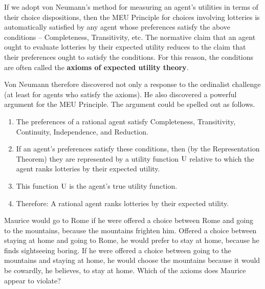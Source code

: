 
If we adopt von Neumann's method for measuring an agent's utilities in terms of
their choice dispositions, then the MEU Principle for choices involving
lotteries is automatically satisfied by any agent whose preferences satisfy the
above conditions -- Completeness, Transitivity, etc. The normative claim that an
agent ought to evaluate lotteries by their expected utility reduces to the claim
that their preferences ought to satisfy the conditions. For this reason, the
conditions are often called the \textbf{axioms of expected utility theory}.

Von Neumann therefore discovered not only a response to the ordinalist challenge
(at least for agents who satisfy the axioms). He also discovered a powerful
argument for the MEU Principle. The argument could be spelled out as follows.

\begin{enumerate}
  \itemsep0em
\item The preferences of a rational agent satisfy Completeness,
  Transitivity, Continuity, Independence, and Reduction.
\item If an agent's preferences satisfy these conditions, then (by the
  Representation Theorem) they are represented by a utility function
  $\text{U}$ relative to which the agent ranks lotteries by their expected utility.
\item This function $\text{U}$ is the agent's true utility function.
\item Therefore: A rational agent ranks lotteries by their expected utility.
\end{enumerate}

\begin{exercise}{1}
  Maurice would go to Rome if he were offered a choice between Rome and going to
  the mountains, because the mountains frighten him. Offered a choice between
  staying at home and going to Rome, he would prefer to stay at home, because he
  finds sightseeing boring. If he were offered a choice between going to the
  mountains and staying at home, he would choose the mountains because it would
  be cowardly, he believes, to stay at home. Which of the axioms does Maurice
  appear to violate?
\end{exercise}

